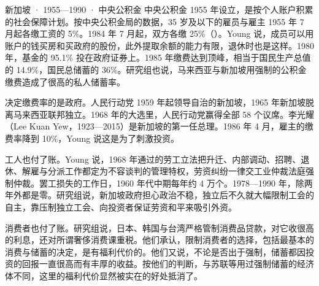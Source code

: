 \begin{case}{新加坡 · 1955—1990 · 中央公积金}
中央公积金 1955 年设立，是按个人账户积累的社会保障计划\cite{young1992}。按中央公积金局的数据，35 岁及以下的雇员与雇主 1955 年 7 月起各缴工资的 5\%\cite{cpf2026}。1984 年 7 月起，双方各缴 25\%（）\cite{cpf2026}。Young 说，成员可以用账户的钱买房和买政府的股份，此外提取余额的能力有限，退休时也是这样\cite{young1992}。1980 年，基金的 95.1\% 投在政府证券上\cite{young1992}。1985 年缴费达到顶峰，相当于国民生产总值的 14.9\%，国民总储蓄的 36\%\cite{young1992}。研究组也说，马来西亚与新加坡用强制的公积金缴费造成了很高的私人储蓄率\cite{worldbank1993}。

决定缴费率的是政府。人民行动党 1959 年起领导自治的新加坡，1965 年新加坡脱离马来西亚联邦独立\cite{worldbank1993}。1968 年的大选里，人民行动党赢得全部 58 个议席\cite{worldbank1993}。李光耀（Lee Kuan Yew，1923—2015）是新加坡的第一任总理\cite{loc42,gnd42}。1986 年 4 月，雇主的缴费率降到 10\%，Young 说这是为了刺激投资\cite{cpf2026,young1992}。

工人也付了账。Young 说，1968 年通过的劳工立法把升迁、内部调动、招聘、退休、解雇与分派工作都定为不容谈判的管理特权，劳资纠纷一律交工业仲裁法庭强制仲裁\cite{young1992}。罢工损失的工作日，1960 年代中期每年约 4 万个\cite{young1992}。1978—1990 年，除两年外都是零\cite{young1992}。研究组说，新加坡政府担心政治不稳，独立后不久就大幅限制工会的自主，靠压制独立工会、向投资者保证劳资和平来吸引外资\cite{worldbank1993}。
\end{case}


消费者也付了账。研究组说，日本、韩国与台湾严格管制消费品贷款，对它收很高的利息，还对所谓奢侈消费课重税\cite{worldbank1993}。他们承认，限制消费者的选择，包括最基本的消费与储蓄的决定，是有福利代价的\cite{worldbank1993}。他们又说，不论是否出于强制，储蓄都因投资的回报一直很高而有丰厚的收益\cite{worldbank1993}。按他们的判断，与苏联等用过强制储蓄的经济体不同，这里的福利代价显然被实在的好处抵消了\cite{worldbank1993}。

